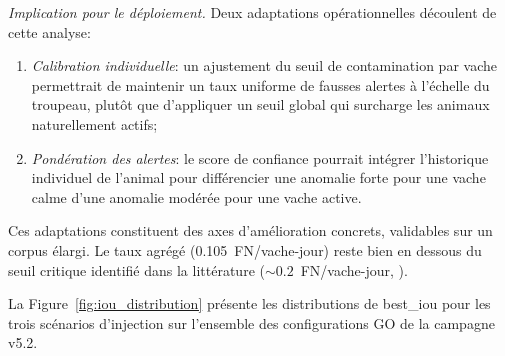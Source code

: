 \textit{Implication pour le déploiement.}
Deux adaptations opérationnelles découlent de cette analyse:
\begin{enumerate}
    \item \textit{Calibration individuelle}: un ajustement du seuil de contamination
    par vache permettrait de maintenir un taux uniforme de fausses alertes à l'échelle du
    troupeau, plutôt que d'appliquer un seuil global qui surcharge les animaux naturellement
    actifs;
    \item \textit{Pondération des alertes}: le score de confiance pourrait intégrer
    l'historique individuel de l'animal pour différencier une anomalie forte pour une vache
    calme d'une anomalie modérée pour une vache active.
\end{enumerate}

Ces adaptations constituent des axes d'amélioration concrets, validables sur un corpus
élargi. Le taux agrégé (0.105~FN/vache-jour) reste bien en dessous du seuil critique
identifié dans la littérature (${\sim}0.2$~FN/vache-jour, \cite{rutten2013invited}).

\label{annexe:distribution_iou}

La Figure~\ref{fig:iou_distribution} présente les distributions de best\_iou pour les
trois scénarios d'injection sur l'ensemble des configurations GO de la campagne v5.2.

